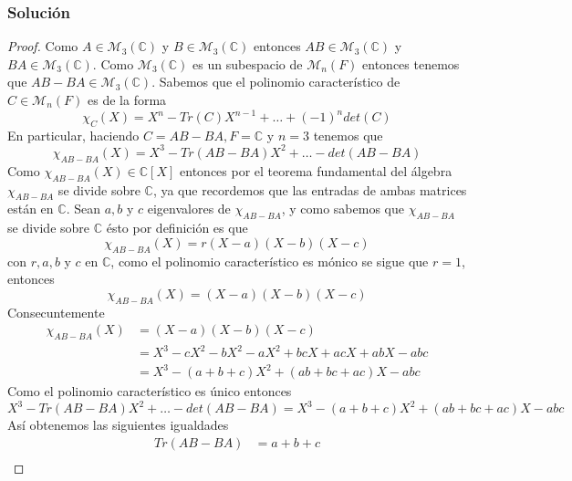 \documentclass[a4paper]{article}
\begin{document}
\subsubsection*{Solución}
\begin{proof}
    Como \(A \in \mathcal{M}_{3}\left(\mathbb{C}\right)\) y \(B \in \mathcal{M}_{3}\left(\mathbb{C}\right)\)
    entonces \(AB \in \mathcal{M}_{3}\left(\mathbb{C}\right)\) y \(BA \in \mathcal{M}_{3}\left(\mathbb{C}\right)\).
    Como \(\mathcal{M}_{3}\left(\mathbb{C}\right)\) es un subespacio de \(\mathcal{M}_{n}\left(F\right)\)
    entonces tenemos que \(AB - BA \in \mathcal{M}_{3}\left(\mathbb{C}\right)\).
    \newline
    Sabemos que el polinomio característico de \(C \in \mathcal{M}_{n}\left(F\right)\) es de
    la forma
    \[
        \chi_{C}\left(X\right) = X^{n} - Tr\left(C\right)X^{n-1} + \dotsc + \left(-1\right)^{n}det(C)
    \]
    En particular, haciendo \(C = AB - BA, F = \mathbb{C}\) y \(n = 3\) tenemos que
    \[
        \chi_{AB - BA}\left(X\right) = X^{3} - Tr\left(AB - BA\right)X^{2} + \dotsc - det(AB - BA)
    \]
    Como \(\chi_{AB - BA}\left(X\right) \in \mathbb{C}[X]\) entonces por el teorema fundamental 
    del álgebra \(\chi_{AB - BA}\) se divide sobre \(\mathbb{C}\), ya que recordemos que las 
    entradas de ambas matrices están en \(\mathbb{C}\). Sean \(a, b\) y \(c\) eigenvalores de 
    \(\chi_{AB - BA}\), y como sabemos que \(\chi_{AB - BA}\) se divide sobre \(\mathbb{C}\) ésto 
    por definición es que
    \[
        \chi_{AB - BA}\left(X\right) = r(X - a)(X - b)(X - c)
    \]
    con \(r, a, b\) y \(c\) en \(\mathbb{C}\), como el polinomio característico es mónico se sigue 
    que \(r = 1\), entonces
    \[
        \chi_{AB - BA}\left(X\right) = (X - a)(X - b)(X - c)
    \]
    Consecuntemente
    \begin{align*}
        \chi_{AB - BA}\left(X\right) &= (X - a)(X - b)(X - c) \\
                                     &=  X^3 - cX^2 - bX^2 - aX^2 + bcX + acX + abX - abc \\
                                     &= X^3 - (a + b + c)X^2 + (ab + bc + ac)X - abc
    \end{align*}
    Como el polinomio característico es único entonces
    \[
        X^{3} - Tr\left(AB - BA\right)X^{2} + \dotsc - det(AB - BA) = X^3 - (a + b + c)X^2 + (ab + bc + ac)X - abc
    \]
    Así obtenemos las siguientes igualdades
    \begin{align*}
        Tr\left(AB - BA\right) &= a + b + c \\

\end{align*}
\end{proof}
\end{document}
